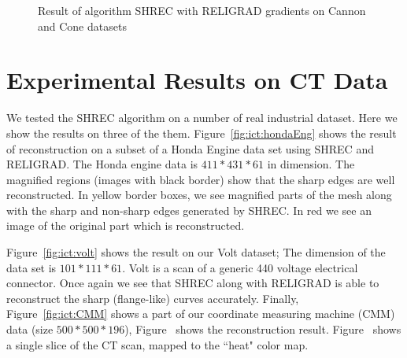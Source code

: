 \begin{figure}[tb]
	\caption{Result of algorithm SHREC with RELIGRAD gradients on Cannon and Cone datasets}
	\label{fig:cannon_cone}
\end{figure}
\section{Experimental Results on CT Data}
We tested the SHREC algorithm on a number of real industrial dataset. Here we show the results on three of the them. 
Figure~\ref{fig:ict:hondaEng} shows the result of reconstruction on a subset of a Honda Engine data set using SHREC and RELIGRAD. The Honda engine data is $411*431*61$ in dimension. The magnified regions (images with black border) show that the sharp edges are well reconstructed. In yellow border boxes, we see magnified parts of the mesh along with the sharp and non-sharp edges generated by SHREC. In red we see an image of the original part which is reconstructed. 


Figure~\ref{fig:ict:volt} shows the result on our Volt dataset; The dimension of the data set is $101*111*61$. Volt is a scan of a generic 440 voltage electrical connector. Once again we see that SHREC along with RELIGRAD is able to reconstruct the sharp (flange-like) curves accurately. Finally, Figure~\ref{fig:ict:CMM} shows a part of our coordinate measuring machine (CMM) data (size $500*500*196$), Figure~\protect{} shows the reconstruction result. Figure~\protect{} shows a single slice of the CT scan, mapped to the ``heat" color map. 

